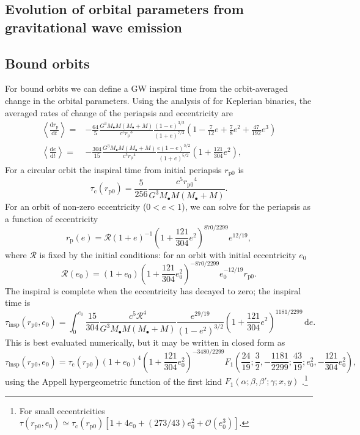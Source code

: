 \documentclass[useAMS,usedcolumn,usegraphicx,usenatbib]{mn2e}
\newcommand{\sub}[1]{\ensuremath{_\mathrm{#1}}}
\newcommand{\dd}{\ensuremath{\mathrm{d}}}
\newcommand{\diff}[2]{\ensuremath{\frac{\dd {#1}}{\dd {#2}}}}
\newcommand{\intd}[4]{\ensuremath{\displaystyle \int_{#1}^{#2}{#3}\,\dd{#4}}}
\newcommand{\order}[1]{\ensuremath{\mathcal{O}({#1})}}
\begin{document}
\begin{onecolumn}
\section{Evolution of orbital parameters from gravitational wave emission}

\subsection{Bound orbits}

For bound orbits we can define a GW inspiral time from the orbit-averaged change in the orbital parameters. Using the analysis of \citet{Peters1964} for Keplerian binaries, the averaged rates of change of the periapsis and eccentricity are
\begin{align}
\left\langle\diff{r\sub{p}}{t}\right\rangle = {} & -\frac{64}{5}\frac{G^3M_\bullet M(M_\bullet + M)}{c^5r\sub{p}^3}\frac{(1 - e)^{3/2}}{(1 + e)^{7/2}}\left(1 - \frac{7}{12}e + \frac{7}{8}e^2 + \frac{47}{192}e^3\right) \\
\left\langle\diff{e}{t}\right\rangle = {} & -\frac{304}{15}\frac{G^3M_\bullet M(M_\bullet + M)}{c^5r\sub{p}^4}\frac{e(1 - e)^{3/2}}{(1 + e)^{5/2}}\left(1 + \frac{121}{304}e^2\right),
\end{align}
For a circular orbit the inspiral time from initial periapsis $r\sub{p0}$ is
\begin{equation}
\tau\sub{c}(r\sub{p0}) = \frac{5}{256}\frac{c^5r\sub{p0}^4}{G^3M_\bullet M(M_\bullet + M)}.
\end{equation}
For an orbit of non-zero eccentricity ($0 < e < 1$), we can solve for the periapsis as a function of eccentricity
\begin{equation}
r\sub{p}(e) = \mathcal{R}(1 + e)^{-1}\left(1 + \frac{121}{304}e^2\right)^{870/2299}e^{12/19},
\end{equation}
where $\mathcal{R}$ is fixed by the initial conditions: for an orbit with initial eccentricity $e_0$
\begin{equation}
\mathcal{R}(e_0) = (1 + e_0)\left(1 + \frac{121}{304}e_0^2\right)^{-870/2299}e_0^{-12/19}r\sub{p0}.
\end{equation}
The inspiral is complete when the eccentricity has decayed to zero; the inspiral time is \citep{Peters1964}
\begin{equation}
\tau\sub{insp}(r\sub{p0},e_0) = \intd{0}{e_0}{\frac{15}{304}\frac{c^5\mathcal{R}^4}{G^3M_\bullet M(M_\bullet + M)}\frac{e^{29/19}}{(1-e^2)^{3/2}}\left(1 + \frac{121}{304}e^2\right)^{1181/2299}}{e}.
\end{equation}
This is best evaluated numerically, but it may be written in closed form as
\begin{equation}
\tau\sub{insp}(r\sub{p0},e_0) = \tau\sub{c}(r\sub{p0})(1 + e_0)^4\left(1 + \frac{121}{304}e_0^2\right)^{-3480/2299} F_1\left(\frac{24}{19};\frac{3}{2},-\frac{1181}{2299};\frac{43}{19};e_0^2,-\frac{121}{304}e_0^2\right),
\label{eq:Bound_inspiral}
\end{equation}
using the Appell hypergeometric function of the first kind $F_1(\alpha;\beta,\beta';\gamma;x,y)$ \citep[16.15.1]{Olver2010}.\footnote{For small eccentricities $\tau(r\sub{p0},e_0) \simeq \tau\sub{c}(r\sub{p0})[1 + 4e_0 + (273/43)e_0^2 + \order{e_0^3}]$.}


\end{onecolumn}
\end{document}
